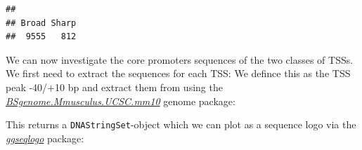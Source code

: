 \documentclass[9pt,a4paper,]{extarticle}
\newenvironment{Shaded}{\begin{snugshade}}{\end{snugshade}}
\newcommand{\KeywordTok}[1]{\textcolor[rgb]{0.13,0.29,0.53}{\textbf{{#1}}}}
\newcommand{\DataTypeTok}[1]{\textcolor[rgb]{0.13,0.29,0.53}{{#1}}}
\newcommand{\DecValTok}[1]{\textcolor[rgb]{0.00,0.00,0.81}{{#1}}}
\newcommand{\StringTok}[1]{\textcolor[rgb]{0.31,0.60,0.02}{{#1}}}
\newcommand{\CommentTok}[1]{\textcolor[rgb]{0.56,0.35,0.01}{\textit{{#1}}}}
\newcommand{\NormalTok}[1]{{#1}}
\begin{document}
\begin{Shaded}
\end{Shaded}

\begin{verbatim}
## 
## Broad Sharp 
##  9555   812
\end{verbatim}

We can now investigate the core promoters sequences of the two classes of TSSs. We first need to extract the sequences for each TSS: We defince this as the TSS peak -40/+10 bp and extract them from using the \emph{\href{https://bioconductor.org/packages/3.8/BSgenome.Mmusculus.UCSC.mm10}{BSgenome.Mmusculus.UCSC.mm10}} genome package:

\begin{Shaded}
\end{Shaded}

This returns a \texttt{DNAStringSet}-object which we can plot as a sequence logo \citep{Manetti2015} via the \emph{\href{https://CRAN.R-project.org/package=ggseqlogo}{ggseqlogo}} package\citep{Wagih2017}:

\begin{Shaded}
\end{Shaded}
\end{document}

